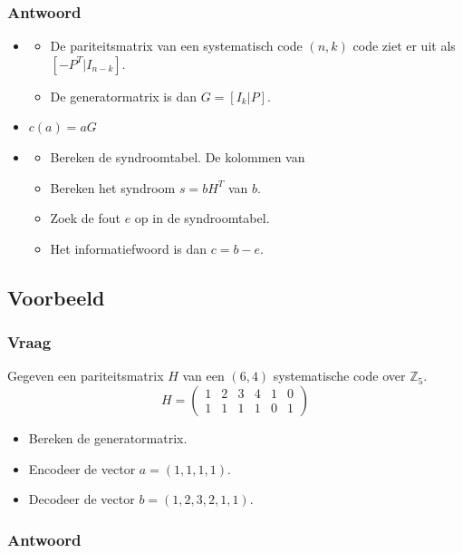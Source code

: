 \documentclass[main.tex]{subfiles}
\begin{document}
\subsubsection*{Antwoord}
\begin{itemize}
\item 
  \begin{itemize}
  \item De pariteitsmatrix van een systematisch code $(n,k)$ code ziet er uit als $[-P^{T}|I_{n-k}]$.
  \item De generatormatrix is dan $G=[I_{k}|P]$.
  \end{itemize}
\item $c(a) = aG$
\item 
  \begin{itemize}
  \item Bereken de syndroomtabel.
    De kolommen van 
  \item Bereken het syndroom $s=bH^{T}$ van $b$.
  \item Zoek de fout $e$ op in de syndroomtabel.
  \item Het informatiefwoord is dan $c=b-e$.
  \end{itemize}
\end{itemize}
\subsection*{Voorbeeld}
\subsubsection*{Vraag}
Gegeven een pariteitsmatrix $H$ van een $(6,4)$ systematische code over $\mathbb{Z}_{5}$.
\[
H =
\begin{pmatrix}
  1 & 2 & 3 & 4 & 1 & 0\\
  1 & 1 & 1 & 1 & 0 & 1
\end{pmatrix}
\]
\begin{itemize}
\item Bereken de generatormatrix.
\item Encodeer de vector $a=(1,1,1,1)$.
\item Decodeer de vector $b=(1,2,3,2,1,1)$.
\end{itemize}
\subsubsection*{Antwoord}
\end{document}
